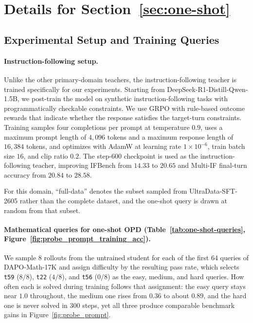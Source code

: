 \section{Details for Section~\ref{sec:one-shot}}

\subsection{Experimental Setup and Training Queries}
\label{app:model-data}

\paragraph{Instruction-following setup.}
\label{app:IF-setup}
Unlike the other primary-domain teachers, the instruction-following teacher is trained specifically for our experiments. Starting from DeepSeek-R1-Distill-Qwen-1.5B, we post-train the model on synthetic instruction-following tasks with programmatically checkable constraints. We use GRPO with rule-based outcome rewards that indicate whether the response satisfies the target-turn constraints. Training samples four completions per prompt at temperature \(0.9\), uses a maximum prompt length of \(4{,}096\) tokens and a maximum response length of \(16{,}384\) tokens, and optimizes with AdamW at learning rate \(1\times10^{-6}\), train batch size \(16\), and clip ratio \(0.2\). The step-600 checkpoint is used as the instruction-following teacher, improving IFBench \citep{pyatkin2026generalizing} from \(14.33\) to \(20.65\) and Multi-IF final-turn accuracy from \(20.84\) to \(28.58\).

For this domain, ``full-data'' denotes the subset sampled from UltraData-SFT-2605 \citep{ultradata-sft-2605} rather than the complete dataset, and the one-shot query is drawn at random from that subset.


\paragraph{Mathematical queries for one-shot OPD (Table~\ref{tab:one-shot-queries}, Figure~\ref{fig:probe_prompt_training_acc}).}
\label{app:training-accuracy}
We sample 8 rollouts from the untrained student for each of the first 64 queries of DAPO-Math-17K and assign difficulty by the resulting pass rate, which selects \texttt{t59} (\(8/8\)), \texttt{t22} (\(4/8\)), and \texttt{t56} (\(0/8\)) as the easy, medium, and hard queries. How often each is solved during training follows that assignment: the easy query stays near \(1.0\) throughout, the medium one rises from \(0.36\) to about \(0.89\), and the hard one is never solved in \(300\) steps, yet all three produce comparable benchmark gains in Figure~\ref{fig:probe_prompt}.

